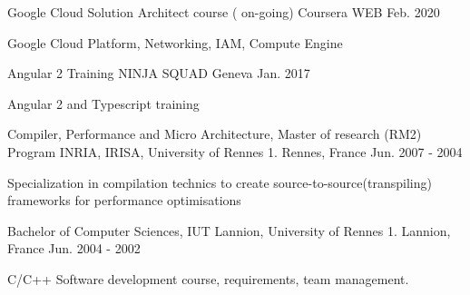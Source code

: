 

\begin{cventries}
\cventry
{Google Cloud Solution Architect course ( on-going)} %
{Coursera} %
{WEB} %
{Feb. 2020} %
{
	\begin{cvitems} %
		\item {Google Cloud Platform, Networking, IAM, Compute Engine}		
	\end{cvitems}
}\cventry
{Angular 2 Training} %
{NINJA SQUAD} %
{Geneva} %
{Jan. 2017} %
{
	\begin{cvitems} %
		\item {Angular 2 and Typescript training}
	\end{cvitems}
}
  \cventry
    {Compiler, Performance and Micro Architecture, Master of research (RM2) Program} %
    {INRIA, IRISA, University of Rennes 1. } %
    {Rennes, France} %
    {Jun. 2007 - 2004} %
    {
      \begin{cvitems} %
        \item {Specialization in compilation technics to create source-to-source(transpiling) frameworks for performance optimisations}
      \end{cvitems}
    }
\cventry
{Bachelor of Computer Sciences, } %
{IUT Lannion, University of Rennes 1. } %
{Lannion, France} %
{Jun. 2004 - 2002} %
{
	\begin{cvitems} %
			\item { C/C++ Software development course, requirements, team management. }
	\end{cvitems}
}

\end{cventries}
